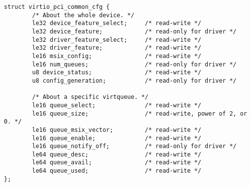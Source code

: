 \begin{lstlisting}
struct virtio_pci_common_cfg {
        /* About the whole device. */
        le32 device_feature_select;     /* read-write */
        le32 device_feature;            /* read-only for driver */
        le32 driver_feature_select;     /* read-write */
        le32 driver_feature;            /* read-write */
        le16 msix_config;               /* read-write */
        le16 num_queues;                /* read-only for driver */
        u8 device_status;               /* read-write */
        u8 config_generation;           /* read-only for driver */

        /* About a specific virtqueue. */
        le16 queue_select;              /* read-write */
        le16 queue_size;                /* read-write, power of 2, or 0. */
        le16 queue_msix_vector;         /* read-write */
        le16 queue_enable;              /* read-write */
        le16 queue_notify_off;          /* read-only for driver */
        le64 queue_desc;                /* read-write */
        le64 queue_avail;               /* read-write */
        le64 queue_used;                /* read-write */
};
\end{lstlisting}

